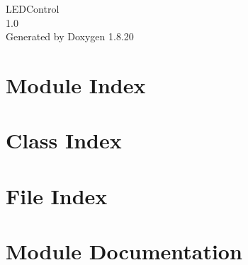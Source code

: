 \let\mypdfximage\pdfximage\def\pdfximage{\immediate\mypdfximage}\documentclass[twoside]{book}
\newcommand{\+}{\discretionary{\mbox{\scriptsize$\hookleftarrow$}}{}{}}
\newcommand{\clearemptydoublepage}{%
  \newpage{\pagestyle{empty}\cleardoublepage}%
}
\begin{document}
\begin{titlepage}
\vspace*{7cm}
\begin{center}%
{\Large L\+E\+D\+Control \\[1ex]\large 1.\+0 }\\
\vspace*{1cm}
{\large Generated by Doxygen 1.8.20}\\
\end{center}
\end{titlepage}
\clearemptydoublepage
{}
\tableofcontents
\clearemptydoublepage
{}

\chapter{Module Index}

\chapter{Class Index}

\chapter{File Index}

\chapter{Module Documentation}









































\end{document}
